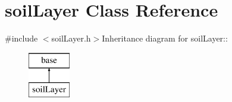 \hypertarget{classsoil_layer}{
\section{soilLayer Class Reference}
\label{classsoil_layer}
}


{\ttfamily \#include $<$soilLayer.h$>$}Inheritance diagram for soilLayer::\begin{figure}[H]
\begin{center}
\leavevmode
\includegraphics[height=2cm]{classsoil_layer}
\end{center}
\end{figure}

